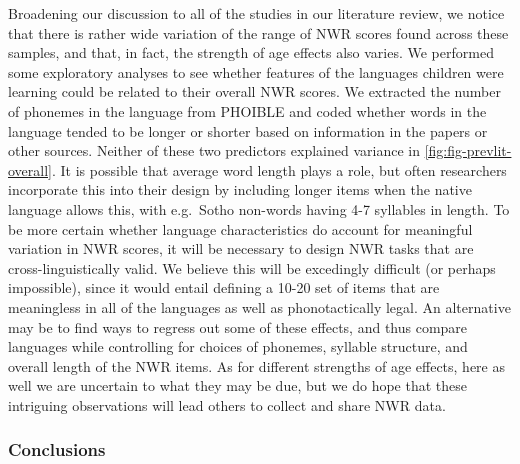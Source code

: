 \documentclass[english,,man,floatsintext]{apa6}
\begin{document}
Broadening our discussion to all of the studies in our literature review, we notice that there is rather wide variation of the range of NWR scores found across these samples, and that, in fact, the strength of age effects also varies. We performed some exploratory analyses to see whether features of the languages children were learning could be related to their overall NWR scores. We extracted the number of phonemes in the language from PHOIBLE and coded whether words in the language tended to be longer or shorter based on information in the papers or other sources. Neither of these two predictors explained variance in \ref{fig:fig-prevlit-overall}. It is possible that average word length plays a role, but often researchers incorporate this into their design by including longer items when the native language allows this, with e.g.~Sotho non-words having 4-7 syllables in length. To be more certain whether language characteristics do account for meaningful variation in NWR scores, it will be necessary to design NWR tasks that are cross-linguistically valid. We believe this will be excedingly difficult (or perhaps impossible), since it would entail defining a 10-20 set of items that are meaningless in all of the languages as well as phonotactically legal. An alternative may be to find ways to regress out some of these effects, and thus compare languages while controlling for choices of phonemes, syllable structure, and overall length of the NWR items. As for different strengths of age effects, here as well we are uncertain to what they may be due, but we do hope that these intriguing observations will lead others to collect and share NWR data.

\hypertarget{conclusions}{%
\subsubsection{Conclusions}\label{conclusions}}
\end{document}

